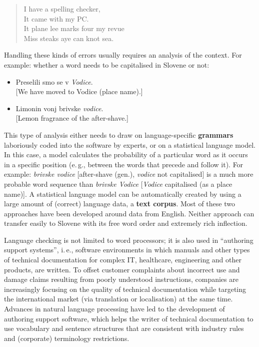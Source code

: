 \begin{multicols}{2}
\begin{quote}
  I have a spelling checker,\\
  It came with my PC.\\
  It plane lee marks four my revue\\
  Miss steaks aye can knot sea.
\end{quote}

Handling these kinds of errors usually requires an analysis of the context. For example: whether a word needs to be capitalised in Slovene or not:

\begin{itemize}
\item Preselili smo se v \textit{Vodice}.\\
{[}We have moved to Vodice (place name).{]} 
\item Limonin vonj brivske \textit{vodice}.\\
{[}Lemon fragrance of the after-shave.{]} 
\end{itemize}

This type of analysis either needs to draw on language-specific \textbf{grammars} laboriously coded into the software by experts, or on a statistical language model. In this case, a model calculates the probability of a particular word as it occurs in a specific position (e.\,g., between the words that precede and follow it). For example: \textit{brivske vodice} [after-shave (gen.), \textit{vodice} not capitalised] is a much more probable word sequence than \textit{brivske Vodice} [\textit{Vodice} capitalised (as a place name)]. A statistical language model can be automatically created by using a large amount of (correct) language data, a \textbf{text corpus}. Most of these two approaches have been developed around data from English. Neither approach can transfer easily to Slovene with its free word order and extremely rich inflection.

Language checking is not limited to word processors; it is also used in “authoring support systems”, i.\,e., software environments in which manuals and other types of technical documentation for complex IT, healthcare, engineering and other products, are written. To offset customer complaints about incorrect use and damage claims resulting from poorly understood instructions, companies are increasingly focusing on the quality of technical documentation while targeting the international market (via translation or localisation) at the same time. Advances in natural language processing have led to the development of authoring support software, which helps the writer of technical documentation to use vocabulary and sentence structures that are consistent with industry rules and (corporate) terminology restrictions.


\end{multicols}
